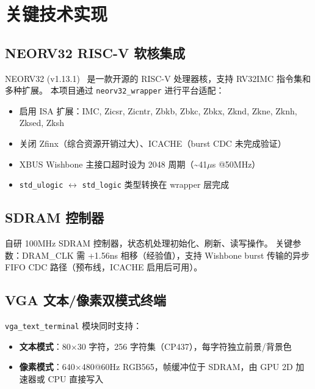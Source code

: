 \documentclass{SYSUReport}
\begin{document}
\section{关键技术实现}

\subsection{NEORV32 RISC-V 软核集成}

NEORV32 (v1.13.1)~\cite{neorv32} 是一款开源的 RISC-V 处理器核，支持 RV32IMC 指令集和多种扩展。
本项目通过 \texttt{neorv32\_wrapper} 进行平台适配：

\begin{itemize}
    \item 启用 ISA 扩展：IMC, Zicsr, Zicntr, Zbkb, Zbkc, Zbkx, Zknd, Zkne, Zknh, Zksed, Zksh
    \item 关闭 Zfinx（综合资源开销过大）、ICACHE（burst CDC 未完成验证）
    \item XBUS Wishbone 主接口超时设为 2048 周期（\textasciitilde{}41$\mu$s @50MHz）
    \item \texttt{std\_ulogic} $\leftrightarrow$ \texttt{std\_logic} 类型转换在 wrapper 层完成
\end{itemize}

\subsection{SDRAM 控制器}

自研 100MHz SDRAM 控制器，状态机处理初始化、刷新、读写操作。
关键参数：DRAM\_CLK 需 +1.56ns 相移（经验值），支持 Wishbone burst 传输的异步 FIFO CDC 路径（预布线，ICACHE 启用后可用）。

\subsection{VGA 文本/像素双模式终端}

\texttt{vga\_text\_terminal} 模块同时支持：

\begin{itemize}
    \item \textbf{文本模式}：80$\times$30 字符，256 字符集（CP437），每字符独立前景/背景色
    \item \textbf{像素模式}：640$\times$480@60Hz RGB565，帧缓冲位于 SDRAM，由 GPU 2D 加速器或 CPU 直接写入
\end{itemize}
\end{document}
